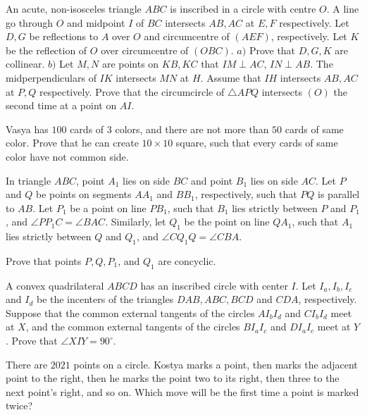\documentclass[11pt]{scrartcl}
\begin{document}
\begin{problem}[796349431725149]
An acute, non-isosceles triangle $ABC$ is inscribed in a circle with centre $O$. A line go through $O$ and midpoint $I$ of $BC$ intersects $AB, AC$ at $E, F$ respectively. Let $D, G$ be reflections to $A$ over $O$ and circumcentre of $(AEF)$, respectively. Let $K$ be the reflection of $O$ over circumcentre of $(OBC)$.
$a)$ Prove that $D, G, K$ are collinear.
$b)$ Let $M, N$ are points on $KB, KC$ that $IM\perp AC$, $IN\perp AB$. The midperpendiculars of $IK$ intersects $MN$ at $H$. Assume that $IH$ intersects $AB, AC$ at $P, Q$ respectively. Prove that the circumcircle of $\triangle APQ$ intersects $(O)$ the second time at a point on $AI$.
\end{problem}
\begin{problem}[122001240071629]
	Vasya has $100$ cards of $3$ colors, and there are not more than $50$ cards of same color. Prove that he can create $10\times 10$ square, such that every cards of same color have not common side.
\end{problem}
\begin{problem}[684771433215596]
In triangle $ABC$, point $A_1$ lies on side $BC$ and point $B_1$ lies on side $AC$. Let $P$ and $Q$ be points on segments $AA_1$ and $BB_1$, respectively, such that $PQ$ is parallel to $AB$. Let $P_1$ be a point on line $PB_1$, such that $B_1$ lies strictly between $P$ and $P_1$, and $\angle PP_1C=\angle BAC$. Similarly, let $Q_1$ be the point on line $QA_1$, such that $A_1$ lies strictly between $Q$ and $Q_1$, and $\angle CQ_1Q=\angle CBA$.

Prove that points $P,Q,P_1$, and $Q_1$ are concyclic.
\end{problem}
\begin{problem}[4451072691230235426]
A convex quadrilateral $ABCD$ has an inscribed circle with center $I$. Let $I_a, I_b, I_c$ and $I_d$ be the incenters of the triangles $DAB, ABC, BCD$ and $CDA$, respectively. Suppose that the common external tangents of the circles $AI_bI_d$ and $CI_bI_d$ meet at $X$, and the common external tangents of the circles $BI_aI_c$ and $DI_aI_c$ meet at $Y$. Prove that $\angle{XIY}=90^{\circ}$.
\end{problem}
\begin{problem}[4742951979457606021]
There are $2021$ points on a circle. Kostya marks a point, then marks the adjacent point to the right, then he marks the point two to its right, then three to the next point's right, and so on. Which move will be the first time a point is marked twice?
\end{problem}
\end{document}
